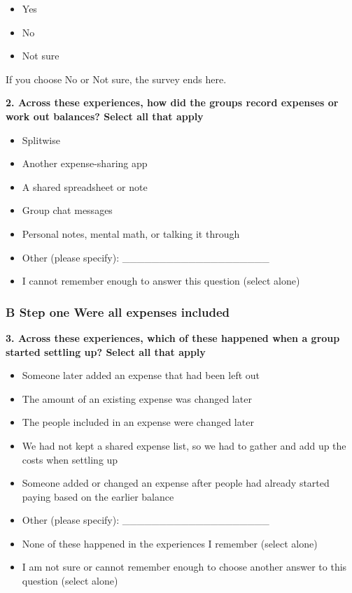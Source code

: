\begin{itemize}
\item
  Yes
\item
  No
\item
  Not sure
\end{itemize}

If you choose No or Not sure, the survey ends here.

\par\smallskip\noindent\textbf{2. Across these experiences, how did the groups record expenses or work out balances? Select all that apply}\par\nobreak

\begin{itemize}
\item
  Splitwise
\item
  Another expense-sharing app
\item
  A shared spreadsheet or note
\item
  Group chat messages
\item
  Personal notes, mental math, or talking it through
\item
  Other (please specify): \_\_\_\_\_\_\_\_\_\_\_\_\_\_\_\_\_\_\_\_
\item
  I cannot remember enough to answer this question (select alone)
\end{itemize}

\subsubsection*{B Step one Were all expenses included}

\par\smallskip\noindent\textbf{3. Across these experiences, which of these happened when a group started settling up? Select all that apply}\par\nobreak

\begin{itemize}
\item
  Someone later added an expense that had been left out
\item
  The amount of an existing expense was changed later
\item
  The people included in an expense were changed later
\item
  We had not kept a shared expense list, so we had to gather and add up the costs when settling up
\item
  Someone added or changed an expense after people had already started paying based on the earlier balance
\item
  Other (please specify): \_\_\_\_\_\_\_\_\_\_\_\_\_\_\_\_\_\_\_\_
\item
  None of these happened in the experiences I remember (select alone)
\item
  I am not sure or cannot remember enough to choose another answer to this question (select alone)
\end{itemize}

